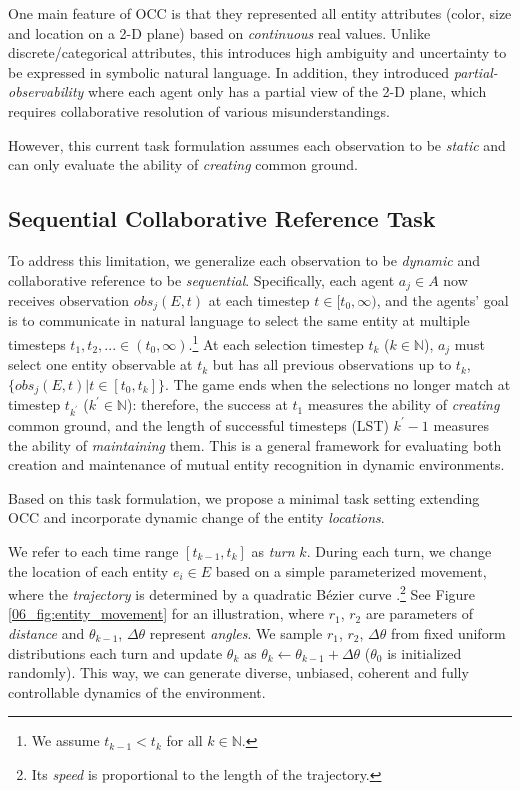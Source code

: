 One main feature of OCC is that they represented all entity attributes (color, size and location on a 2-D plane) based on \textit{continuous} real values. Unlike discrete/categorical attributes, this introduces high ambiguity and uncertainty to be expressed in symbolic natural language. In addition, they introduced \textit{partial-observability} where each agent only has a partial view of the 2-D plane, which requires collaborative resolution of various misunderstandings.

However, this current task formulation assumes each observation to be \textit{static} and can only evaluate the ability of \textit{creating} common ground.

\subsection{Sequential Collaborative Reference Task}
\label{06_subsec:sequential_collaborative_reference_task}

To address this limitation, we generalize each observation to be \textit{dynamic} and collaborative reference to be \textit{sequential}. Specifically, each agent $a_j \in A$ now receives observation $obs_j(E, t)$ at each timestep $t \in [t_0, \infty)$, and the agents' goal is to communicate in natural language to select the same entity at multiple timesteps $t_1, t_2, ... \in (t_0, \infty)$.\footnote{We assume $t_{k -1} < t_k $ for all $k \in \mathbb{N}$.} At each selection timestep $t_k$ ($k \in \mathbb{N}$), $a_j$ must select one entity observable at $t_k$ but has all previous observations up to $t_k$, $\{obs_j(E, t) | t \in [t_0, t_k] \}$. The game ends when the selections no longer match at timestep $t_{k^\prime}$ ($k^\prime \in \mathbb{N}$): therefore, the success at $t_1$ measures the ability of \textit{creating} common ground, and the length of successful timesteps (LST) $k^\prime-1$ measures the ability of \textit{maintaining} them. This is a general framework for evaluating both creation and maintenance of mutual entity recognition in dynamic environments.

Based on this task formulation, we propose a minimal task setting extending OCC and incorporate dynamic change of the entity \textit{locations}.

We refer to each time range $[t_{k-1}, t_k]$ as \textit{turn} $k$. During each turn, we change the location of each entity $e_i \in E$ based on a simple parameterized movement, where the \textit{trajectory} is determined by a quadratic B\'{e}zier curve \citep{bezier1974mathematical}.\footnote{Its \textit{speed} is proportional to the length of the trajectory.} See Figure \ref{06_fig:entity_movement} for an illustration, where $r_{1}$, $r_{2}$ are parameters of \textit{distance} and $\theta_{k-1}$, $\Delta \theta$ represent \textit{angles}. We sample $r_{1}$, $r_{2}$, $\Delta \theta$ from fixed uniform distributions each turn and update $\theta_{k}$ as $\theta_{k} \leftarrow \theta_{k-1} + \Delta \theta$ ($\theta_{0}$ is initialized randomly). This way, we can generate diverse, unbiased, coherent and fully controllable dynamics of the environment.

